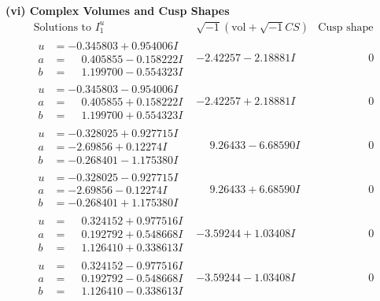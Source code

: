 \documentclass[1p]{elsarticle_modified}
\theoremstyle{definition}
\newcommand{\I}{\sqrt{-1}}
\begin{document}
\newpage\flushleft \textbf{(vi) Complex Volumes and Cusp Shapes}
$$\begin{array}{c|c|c}  
\text{Solutions to }I^u_{1}& \I (\text{vol} + \sqrt{-1}CS) & \text{Cusp shape}\\
 \hline 
\begin{aligned}
u &= -0.345803 + 0.954006 I \\
a &= \phantom{-}0.405855 - 0.158222 I \\
b &= \phantom{-}1.199700 - 0.554323 I\end{aligned}
 & -2.42257 - 2.18881 I & \phantom{-0.000000 } 0 \\ \hline\begin{aligned}
u &= -0.345803 - 0.954006 I \\
a &= \phantom{-}0.405855 + 0.158222 I \\
b &= \phantom{-}1.199700 + 0.554323 I\end{aligned}
 & -2.42257 + 2.18881 I & \phantom{-0.000000 } 0 \\ \hline\begin{aligned}
u &= -0.328025 + 0.927715 I \\
a &= -2.69856 + 0.12274 I \\
b &= -0.268401 - 1.175380 I\end{aligned}
 & \phantom{-}9.26433 - 6.68590 I & \phantom{-0.000000 } 0 \\ \hline\begin{aligned}
u &= -0.328025 - 0.927715 I \\
a &= -2.69856 - 0.12274 I \\
b &= -0.268401 + 1.175380 I\end{aligned}
 & \phantom{-}9.26433 + 6.68590 I & \phantom{-0.000000 } 0 \\ \hline\begin{aligned}
u &= \phantom{-}0.324152 + 0.977516 I \\
a &= \phantom{-}0.192792 + 0.548668 I \\
b &= \phantom{-}1.126410 + 0.338613 I\end{aligned}
 & -3.59244 + 1.03408 I & \phantom{-0.000000 } 0 \\ \hline\begin{aligned}
u &= \phantom{-}0.324152 - 0.977516 I \\
a &= \phantom{-}0.192792 - 0.548668 I \\
b &= \phantom{-}1.126410 - 0.338613 I\end{aligned}
 & -3.59244 - 1.03408 I & \phantom{-0.000000 } 0 \\ \hline\begin{aligned}

\end{aligned}
\end{array}$$
\end{document}
